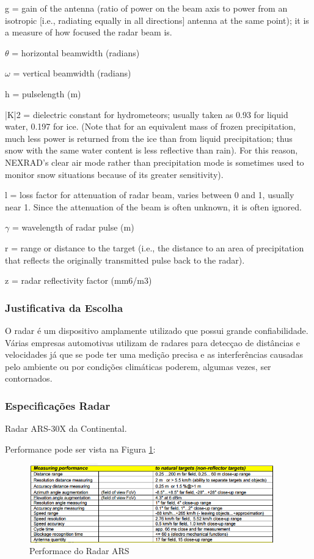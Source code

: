 g = gain of the antenna (ratio of power on the beam axis to power from an isotropic [i.e.,
radiating equally in all directions] antenna at the same point); it is a measure
of how focused the radar beam is.

$\theta$ = horizontal beamwidth (radians)

$\omega$ = vertical beamwidth (radians)

h = pulselength (m)

|K|2 = dielectric constant for hydrometeors; usually taken as 0.93 for liquid water, 0.197 for
 ice. (Note that for an equivalent mass of frozen precipitation, much less power is returned
 from the ice than from liquid precipitation; thus snow with the same water content is
  less reflective than rain). For this reason, NEXRAD’s clear air mode rather than
  precipitation mode is sometimes used to monitor snow situations because of its greater
  sensitivity).

l = loss factor for attenuation of radar beam, varies between 0 and 1, usually near 1.
 Since the attenuation of the beam is often unknown, it is often ignored.

$\gamma$ = wavelength of radar pulse (m)

r = range or distance to the target (i.e., the distance to an area of precipitation that reflects the originally transmitted pulse back to the radar).

z = radar reflectivity factor (mm6/m3)

\subsubsection{Justificativa da Escolha}

O radar é um dispositivo amplamente utilizado que possui grande confiabilidade. Várias empresas automotivas utilizam de radares para detecçao de distâncias e velocidades já que se pode ter uma medição precisa e as interferências causadas pelo ambiente ou por condições climáticas poderem, algumas vezes, ser contornados.

\subsubsection{Especificações Radar}


Radar ARS-30X da Continental.

Performance pode ser vista na Figura \ref{fig:performace_radar}:
\begin{figure}[h]
  \centering
  \includegraphics[width=400px, scale=1]{figuras/performace_radar}
  \caption{Performace do Radar ARS}
\label{fig:performace_radar}
\end{figure}

